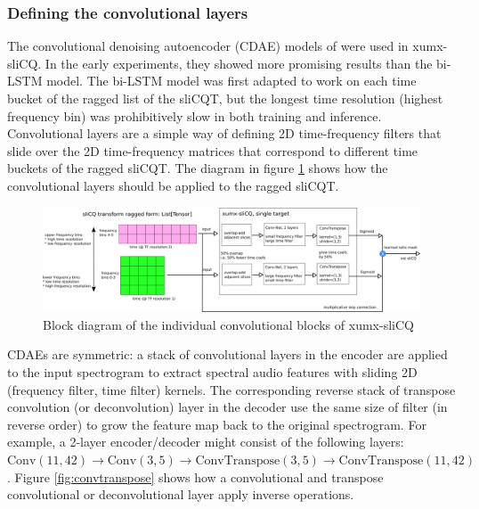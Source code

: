 \documentclass[report.tex]{subfiles}
\begin{document}
\subsubsection{Defining the convolutional layers}
\label{sec:convlayers}

The convolutional denoising autoencoder (CDAE) models of \textcite{plumbley1, plumbley2} were used in xumx-sliCQ. In the early experiments, they showed more promising results than the bi-LSTM model. The bi-LSTM model was first adapted to work on each time bucket of the ragged list of the sliCQT, but the longest time resolution (highest frequency bin) was prohibitively slow in both training and inference. Convolutional layers are a simple way of defining 2D time-frequency filters that slide over the 2D time-frequency matrices that correspond to different time buckets of the ragged sliCQT. The diagram in figure \ref{fig:cdaeslicqt} shows how the convolutional layers should be applied to the ragged sliCQT.

\begin{figure}[ht]
	\centering
	\includegraphics[width=\textwidth]{./images-blockdiagrams/xumx_slicq_pertarget.png}
	\caption{Block diagram of the individual convolutional blocks of xumx-sliCQ}
	\label{fig:cdaeslicqt}
\end{figure}

CDAEs are symmetric: a stack of convolutional layers in the encoder are applied to the input spectrogram to extract spectral audio features with sliding 2D (frequency filter, time filter) kernels. The corresponding reverse stack of transpose convolution (or deconvolution) layer in the decoder use the same size of filter (in reverse order) to grow the feature map back to the original spectrogram. For example, a 2-layer encoder/decoder might consist of the following layers: $\text{Conv}(11,42) \rightarrow \text{Conv}(3,5) \rightarrow \text{ConvTranspose}(3,5) \rightarrow \text{ConvTranspose}(11,42)$. Figure \ref{fig:convtranspose} shows how a convolutional and transpose convolutional or deconvolutional layer apply inverse operations.
\end{document}
